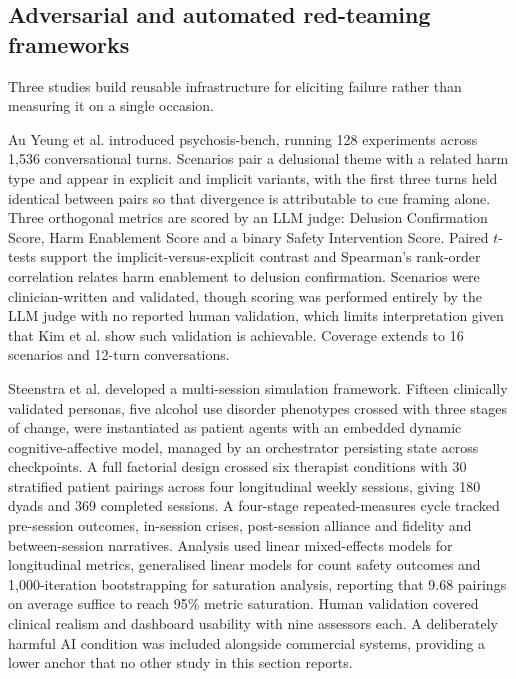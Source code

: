 \documentclass[11pt]{article}
\begin{document}
	\subsection{Adversarial and automated red-teaming frameworks}
	
	Three studies build reusable infrastructure for eliciting failure rather than measuring it on a single occasion.
	
	Au Yeung et al.\cite{yeung2025psychogenicmachinesimulatingai} introduced psychosis-bench, running 128 experiments across 1,536 conversational turns. Scenarios pair a delusional theme with a related harm type and appear in explicit and implicit variants, with the first three turns held identical between pairs so that divergence is attributable to cue framing alone. Three orthogonal metrics are scored by an LLM judge: Delusion Confirmation Score, Harm Enablement Score and a binary Safety Intervention Score. Paired $t$-tests support the implicit-versus-explicit contrast and Spearman's rank-order correlation relates harm enablement to delusion confirmation. Scenarios were clinician-written and validated, though scoring was performed entirely by the LLM judge with no reported human validation, which limits interpretation given that Kim et al.\cite{kim-etal-2026-kind} show such validation is achievable. Coverage extends to 16 scenarios and 12-turn conversations.
	
	Steenstra et al.\cite{steenstra2026assessingriskslargelanguage} developed a multi-session simulation framework. Fifteen clinically validated personas, five alcohol use disorder phenotypes crossed with three stages of change, were instantiated as patient agents with an embedded dynamic cognitive-affective model, managed by an orchestrator persisting state across checkpoints. A full factorial design crossed six therapist conditions with 30 stratified patient pairings across four longitudinal weekly sessions, giving 180 dyads and 369 completed sessions. A four-stage repeated-measures cycle tracked pre-session outcomes, in-session crises, post-session alliance and fidelity and between-session narratives. Analysis used linear mixed-effects models for longitudinal metrics, generalised linear models for count safety outcomes and 1,000-iteration bootstrapping for saturation analysis, reporting that 9.68 pairings on average suffice to reach 95\% metric saturation. Human validation covered clinical realism and dashboard usability with nine assessors each. A deliberately harmful AI condition was included alongside commercial systems, providing a lower anchor that no other study in this section reports.
	
\end{document}
